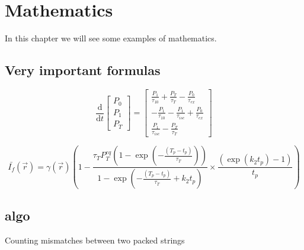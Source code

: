 \chapter{Mathematics}
In this chapter we will see some examples of mathematics.

\lipsum[1]

\section{Very important formulas}
\lipsum[2]

\begin{equation}\label{eqn:rate_eqns}
\frac{\textrm{d}}{\textrm{d}t}\left[
\begin{array}{l}
P_{\textit{0}} \\
P_{\textit{1}} \\
P_{\textit{T}}
\end{array}
\right] =
\left[
\begin{array}{l}
\frac{P_{\textit{1}}}{\tau_{\textit{10}}} + \frac{P_{\textit{T}}}{\tau_{\textit{T}}} - \frac{P_{\textit{0}}}{\tau_{\textit{ex}}} \\
- \frac{P_{\textit{1}}}{\tau_{\textit{10}}} - \frac{P_{\textit{1}}}{\tau_{isc}} + \frac{P_{\textit{0}}}{\tau_{\textit{ex}}} \\
\frac{P_{\textit{1}}}{\tau_{isc}} -  \frac{P_{\textit{T}}}{\tau_{\textit{T}}}
\end{array}
\right]
\end{equation}

\lipsum[3]


\begin{equation}\label{eqn:avgfluorescence}
\bar{I_{f}}(\vec{r})
	= \gamma(\vec{r}) \left(1 - \frac{\tau_{\textit{T}} P_{\textit{T}}^{{eq}}\left(1-\exp \left(-\frac{(T_p - t_p)}{\tau_{\textit{T}}}\right)\right)}{1-\exp\left(-\frac{(T_p - t_p)}{\tau_{\textit{T}}} + k_{\textit{2}} t_p\right)} \times \frac{\left(\exp\left(k_{\textit{2}} t_p\right)-1\right)}{t_p} \right)
\end{equation}

\lipsum[3]

\section{algo}

\begin{algorithm}[H]
    \caption{Counting mismatches between two packed  strings
      \label{alg:packed-dna-hamming}}
    \begin{algorithmic}[1]
      \Statex
         
          \EndIf
        \EndFor
        \State \Return{$\delta$}
      \EndFunction
    \end{algorithmic}
  \end{algorithm}